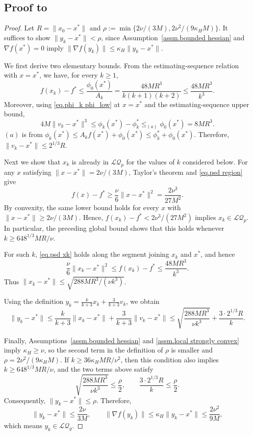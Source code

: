 \documentclass{article}
\begin{document}
\subsection*{Proof to }
\begin{proof}
    Let $R=\|x_0-x^*\|$ and
    \(\rho:=\min\{2\nu/(3M),2\nu^2/(9\kappa_HM)\}\).
    It suffices to show $\|y_k-x^*\|<\rho$, since Assumption~\ref{assm.bounded hessian} and
    $\nabla f(x^*)=0$ imply
    \(\|\nabla f(y_k)\|\leq \kappa_H\|y_k-x^*\|\).

    We first derive two elementary bounds. From the estimating-sequence relation with
    $x=x^*$, we have, for every $k\geq1$,
    \[
        f(x_k)-f^*
        \leq \frac{\phi_0(x^*)}{A_k}
        = \frac{48MR^3}{k(k+1)(k+2)}
        \leq \frac{48MR^3}{k^3}.
    \]
    Moreover, using \eqref{eq.phi_k phi_low} at $x=x^*$ and the estimating-sequence
    upper bound,
    \[
        4M\|v_k-x^*\|^3
        \leq \phi_k(x^*)-\phi_k^*
        \leq_{(a)} \phi_0(x^*)
        =8MR^3.
    \]
    $(a)$ is from $\phi_k(x^*)\le A_k f(x^*)+\phi_0(x^*) \le \phi_k^*+\phi_0(x^*)$. Therefore,
    \(
    \|v_k-x^*\|\leq 2^{1/3}R.
    \)

    Next we show that $x_k$ is already in $\mathcal{LQ}_p$ for the values of $k$
    considered below. For any $x$ satisfying
    $\|x-x^*\|=2\nu/(3M)$, Taylor's theorem and \eqref{eq.psd region} give
    \[
        f(x)-f^*
        \geq \frac{\nu}{6}\|x-x^*\|^2
        = \frac{2\nu^3}{27M^2}.
    \]
    By convexity, the same lower bound holds for every
    $x$ with $\|x-x^*\|\geq 2\nu/(3M)$. Hence,
    \(f(x_k)-f^*<2\nu^3/(27M^2)\) implies $x_k\in\mathcal{LQ}_p$.
    In particular, the preceding global bound shows that this holds whenever
    \(k\geq 648^{1/3}MR/\nu\).

    For such $k$, \eqref{eq.psd xk} holds along the segment joining $x_k$ and $x^*$,
    and hence
    \[
        \frac{\nu}{6}\|x_k-x^*\|^2
        \leq f(x_k)-f^*
        \leq \frac{48MR^3}{k^3}.
    \]
    Thus \(\|x_k-x^*\|\leq \sqrt{288MR^3/(\nu k^3)}\).

    Using the definition
    \(y_k=\frac{k}{k+3}x_k+\frac{3}{k+3}v_k\), we obtain
    \[
        \|y_k-x^*\|
        \leq \frac{k}{k+3}\|x_k-x^*\|
        +\frac{3}{k+3}\|v_k-x^*\|
        \leq \sqrt{\frac{288MR^3}{\nu k^3}}
        +\frac{3\cdot 2^{1/3}R}{k}.
    \]

    Finally, Assumptions~\ref{assm.bounded hessian} and
    \ref{assm.local strongly convex} imply $\kappa_H\geq \nu$, so the second
    term in the definition of \(\rho\) is smaller and
    \(\rho=2\nu^2/(9\kappa_HM)\). If
    \(k\geq 36\kappa_H M R/\nu^2\), then this condition also implies
    \(k\geq 648^{1/3}MR/\nu\),
    and the two terms above satisfy
    \[
        \sqrt{\frac{288MR^3}{\nu k^3}}
        \leq \frac{\rho}{2},
        \qquad
        \frac{3\cdot 2^{1/3}R}{k}
        \leq \frac{\rho}{2}.
    \]
    Consequently, \(\|y_k-x^*\|\leq \rho\).
    Therefore,
    \[
        \|y_k-x^*\|\leq \frac{2\nu}{3M},
        \qquad
        \|\nabla f(y_k)\|
        \leq \kappa_H\|y_k-x^*\|
        \leq \frac{2\nu^2}{9M},
    \]
    which means $y_k\in\mathcal{LQ}_g$.
\end{proof}
\end{document}
